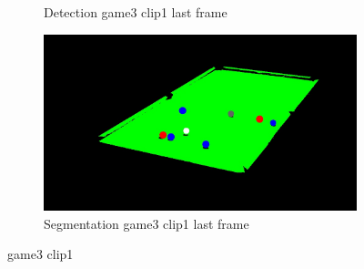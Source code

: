 \begin{figure}[H]
\begin{subfigure}[b]{0.35\textwidth}
        \caption{Detection game3 clip1 last frame}
        \label{fig: game3_clip1_last_frame_detected}
    \end{subfigure}
    \begin{subfigure}[b]{0.35\textwidth}
        \centering
        \includegraphics[width=\textwidth]{images/Segmentation/game3_clip1_segmented_balls_last_frame.jpg}
        \caption{Segmentation game3 clip1 last frame}
		\label{fig: game3_clip1_last_frame_segmented}
    \end{subfigure}
    
	\caption{game3 clip1}
\end{figure}

